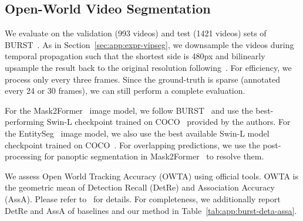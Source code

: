 \subsection{Open-World Video Segmentation}
We evaluate on the validation (993 videos) and test (1421 videos) sets of BURST~\cite{athar2023burst}. 
As in Section~\ref{sec:app:expr-vipseg}, we downsample the videos during temporal propagation such that the shortest side is 480px and bilinearly upsample the result back to the original resolution following~\cite{cheng2022xmem}. For efficiency, we process only every three frames. Since the ground-truth is sparse (annotated every 24 or 30 frames), we can still perform a complete evaluation.

For the Mask2Former~\cite{cheng2022masked} image model, we follow BURST~\cite{athar2023burst} and use the best-performing Swin-L checkpoint trained on COCO~\cite{lin2014microsoft} provided by the authors. 
For the EntitySeg~\cite{qi2021open} image model, we also use the best available Swin-L model checkpoint trained on COCO~\cite{lin2014microsoft}.
For overlapping predictions, we use the post-processing for panoptic segmentation in Mask2Former~\cite{cheng2022masked} to resolve them.

We assess Open World Tracking Accuracy (OWTA) using official tools. OWTA is the geometric mean of Detection Recall (DetRe) and Association Accuracy (AssA). Please refer to~\cite{athar2023burst} for details. For completeness, we additionally report DetRe and AssA of baselines and our method in Table~\ref{tab:app:burst-deta-assa}.

